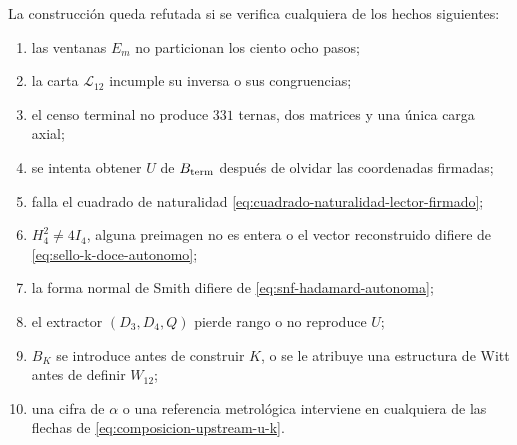 \begin{criterion}
La construcción queda refutada si se verifica cualquiera de los hechos
siguientes:
\begin{enumerate}
 \item las ventanas \(E_m\) no particionan los ciento ocho pasos;
 \item la carta \(\mathcal L_{12}\) incumple su inversa o sus congruencias;
 \item el censo terminal no produce \(331\) ternas, dos matrices y una única
       carga axial;
 \item se intenta obtener \(U\) de \(B_{\rm term}\) después de olvidar las
       coordenadas firmadas;
 \item falla el cuadrado de naturalidad
       \eqref{eq:cuadrado-naturalidad-lector-firmado};
 \item \(H_4^2\neq4I_4\), alguna preimagen no es entera o el vector
       reconstruido difiere de \eqref{eq:sello-k-doce-autonomo};
 \item la forma normal de Smith difiere de
       \eqref{eq:snf-hadamard-autonoma};
 \item el extractor \((D_3,D_4,Q)\) pierde rango o no reproduce \(U\);
 \item \(B_K\) se introduce antes de construir \(K\), o se le atribuye una
       estructura de Witt antes de definir \(W_{12}\);
 \item una cifra de \(\alpha\) o una referencia metrológica interviene en
       cualquiera de las flechas de \eqref{eq:composicion-upstream-u-k}.
\end{enumerate}
\end{criterion}
